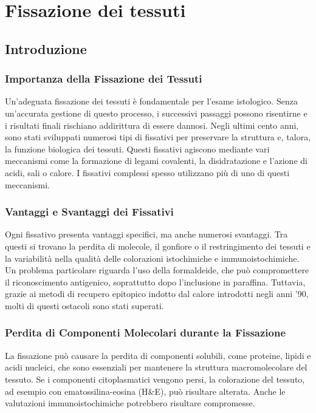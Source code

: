 \chapter{Fissazione dei tessuti}
\section{Introduzione}


\subsection{Importanza della Fissazione dei Tessuti}
Un'adeguata fissazione dei tessuti è fondamentale per l'esame istologico. Senza un'accurata gestione di questo processo, i successivi passaggi possono risentirne e i risultati finali rischiano addirittura di essere dannosi. Negli ultimi cento anni, sono stati sviluppati numerosi tipi di fissativi per preservare la struttura e, talora, la funzione biologica dei tessuti. Questi fissativi agiscono mediante vari meccanismi come la formazione di legami covalenti, la disidratazione e l'azione di acidi, sali o calore. I fissativi complessi spesso utilizzano più di uno di questi meccanismi.

\subsection{Vantaggi e Svantaggi dei Fissativi}
Ogni fissativo presenta vantaggi specifici, ma anche numerosi svantaggi. Tra questi si trovano la perdita di molecole, il gonfiore o il restringimento dei tessuti e la variabilità nella qualità delle colorazioni istochimiche e immunoistochimiche. Un problema particolare riguarda l'uso della formaldeide, che può compromettere il riconoscimento antigenico, soprattutto dopo l'inclusione in paraffina. Tuttavia, grazie ai metodi di recupero epitopico indotto dal calore introdotti negli anni '90, molti di questi ostacoli sono stati superati.

\subsection{Perdita di Componenti Molecolari durante la Fissazione}
La fissazione può causare la perdita di componenti solubili, come proteine, lipidi e acidi nucleici, che sono essenziali per mantenere la struttura macromolecolare del tessuto. Se i componenti citoplasmatici vengono persi, la colorazione del tessuto, ad esempio con ematossilina-eosina (H\&E), può risultare alterata. Anche le valutazioni immunoistochimiche potrebbero risultare compromesse.

